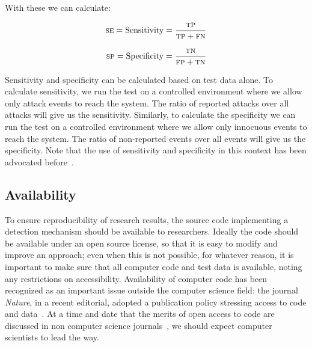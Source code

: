 \documentclass[10pt,journal,compsoc]{IEEEtran}
\begin{document}
\noindent
With these we can calculate:

\vspace{0.5mm}
\noindent\begin{minipage}{0.5\linewidth}
\begin{equation}
  \textsc{se} = \textrm{Sensitivity} = \frac{\textsc{tp}}{\textsc{tp}
    + \textsc{fn}}
\label{eq:sensitivity}
\end{equation}
\end{minipage}%
\begin{minipage}{0.5\linewidth}
\begin{equation}
  \textsc{sp} = \textrm{Specificity} = \frac{\textsc{tn}}{\textsc{fp}
    + \textsc{tn}}
\label{eq:specificity}
\end{equation}
\end{minipage}\par\vspace{\belowdisplayskip}

\noindent
Sensitivity and specificity can be calculated based on test
data alone. To calculate sensitivity, we run the test on a
controlled environment where we allow only attack events to reach the
system. The ratio of reported attacks over all attacks will give us
the sensitivity. Similarly, to calculate the specificity we can run
the test on a controlled environment where we allow only innocuous
events to reach the system. The ratio of non-reported events over all
events will give us the specificity.
Note that the use of sensitivity and specificity in this context
has been advocated before~\cite{PP12}.

\subsection{Availability}

To ensure reproducibility of research results, the source code
implementing a detection mechanism should be available to researchers.
Ideally the code should be available under an open source license, so
that it is easy to modify and improve an approach; even when this is
not possible, for whatever reason, it is important to make sure that
all computer code and test data is available, noting any restrictions
on accessibility. Availability of computer code has been recognized as
an important issue outside the computer science field: the journal
\emph{Nature}, in a recent editorial, adopted a publication policy stressing
access to code and data~\cite{nature2014}. At a time and date that the
merits of open access to code are discussed in non computer science
journals~\cite{easterbrook2014}, we should expect computer scientists
to lead the way.
 
\end{document}
